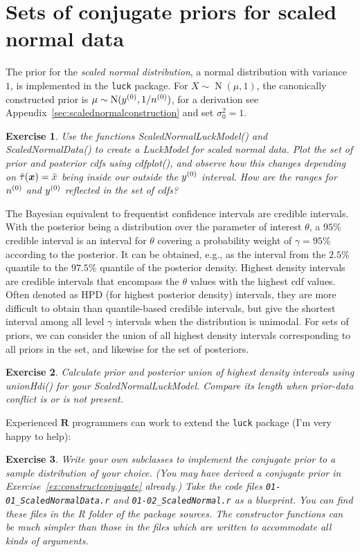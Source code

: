 \documentclass[12pt,a4paper	,twoside]{article}
\newcommand{\norm}{\operatorname{N}}
\newcommand{\code}[1]{\emph{\ttfamily #1}}
\newtheorem{myex}{Exercise}
\begin{document}
\section{Sets of conjugate priors for scaled normal data}

The prior for the \emph{scaled normal distribution}, a normal distribution with variance $1$,
is implemented in the \texttt{luck} package.
For $X \sim \norm(\mu,1)$, the canonically constructed prior is $\mu \sim \norm(\yz, 1/\nz)$,
for a derivation see Appendix~\ref{sec:scalednormalconstruction} and set $\sigma^2_0=1$.
\begin{myex}
Use the functions \code{ScaledNormalLuckModel()} and \code{ScaledNormalData()}
to create a \code{LuckModel} for scaled normal data.
Plot the set of prior and posterior cdfs using \code{cdfplot()},
and observe how this changes depending on $\tilde{\tau}({\boldsymbol{x}}) = \bar{x}$ being inside our outside the $y^{(0)}$ interval.
How are the ranges for $n^{(0)}$ and $y^{(0)}$ reflected in the set of cdfs?
\end{myex}
The Bayesian equivalent to frequentist confidence intervals are credible intervals.
With the posterior being a distribution over the parameter of interest $\theta$,
a $95$\% credible interval is an interval for $\theta$ covering a probability weight of $\gamma = 95$\% according to the posterior.
It can be obtained, e.g., as the interval from the $2.5$\% quantile to the $97.5$\% quantile of the posterior density.
Highest density intervals are credible intervals that encompass the $\theta$ values with the highest cdf values.
Often denoted as HPD (for highest posterior density) intervals, 
they are more difficult to obtain than quantile-based credible intervals,
but give the shortest interval among all level $\gamma$ intervals when the distribution is unimodal.
For sets of priors, we can consider the union of all highest density intervals corresponding to all priors in the set,
and likewise for the set of posteriors.
\begin{myex}
Calculate prior and posterior union of highest density intervals using \code{unionHdi()}
for your \code{ScaledNormalLuckModel}.
Compare its length when prior-data conflict is or is not present. 
\end{myex}
%
Experienced $\textbf{R}$ programmers can work to extend the \texttt{luck} package (I'm very happy to help):
\begin{myex}
Write your own subclasses to implement the conjugate prior to a sample distribution of your choice.
(You may have derived a conjugate prior in Exercise~\ref{ex:constructconjugate} already.)
Take the code files \verb+01-01_ScaledNormalData.r+ and \verb+01-02_ScaledNormal.r+ as a blueprint.
You can find these files in the \code{R} folder of the package sources.
The constructor functions can be much simpler than those in the files which are written to accommodate all kinds of arguments.
\end{myex}
\end{document}
